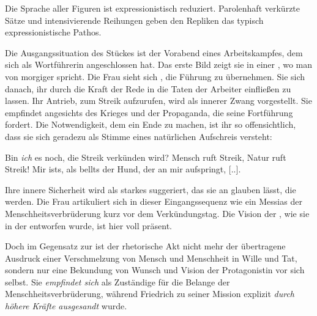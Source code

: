 Die Sprache aller Figuren ist expressionistisch reduziert. Parolenhaft
verkürzte Sätze und intensivierende Reihungen geben den Repliken das typisch
expressionistische Pathos.


Die Ausgangssituation des Stückes ist der Vorabend eines Arbeitskampfes, dem sich
\Cite{die Frau} als Wortführerin angeschlossen hat. Das erste Bild zeigt sie
in einer \Cite{Arbeiterschänke} , wo man von morgiger
\Cite{Entscheidung}
spricht. Die Frau sieht sich \Cite{bereit}, die Führung zu übernehmen. Sie
\Cite{sehnt} sich danach, ihr \Cite{Herzblut} durch die Kraft der Rede in die
Taten der Arbeiter einfließen zu lassen. Ihr Antrieb, zum Streik aufzurufen,
wird als innerer Zwang vorgestellt. Sie empfindet \Cite{Scham und Qual}
angesichts des Krieges und der Propaganda, die seine Fortführung fordert.  Die
Notwendigkeit, dem ein Ende zu machen, ist ihr so offensichtlich, dass sie sich
geradezu als Stimme eines natürlichen Aufschreis versteht:

\begin{BlockQuote}
Bin \emph{ich} es noch, die Streik verkünden wird? Mensch ruft Streik, Natur
ruft Streik! Mir ists, als bellts der Hund, der an mir aufspringt, [..].
\end{BlockQuote}
Ihre innere Sicherheit wird als starkes \Cite{Wissen} suggeriert, das sie
an \Cite{Armeen der Menschheit} glauben lässt, die \Cite{das Friedenswerk zum
unsichtbaren Dome türmen} werden.  Die Frau artikuliert sich in dieser
Eingangssequenz wie ein Messias der Menschheitsverbrüderung kurz vor dem
Verkündungstag. Die Vision der \Cite{Menschheitskathedrale}, wie sie in
der  entworfen wurde, 
ist hier voll präsent.

Doch im Gegensatz zur  ist der rhetorische Akt
nicht mehr der übertragene Ausdruck einer Verschmelzung von Mensch und
Menschheit in Wille und Tat, sondern nur eine Bekundung von Wunsch und Vision
der Protagonistin vor sich selbst. Sie \emph{empfindet sich} als Zuständige
für die Belange der Menschheitsverbrüderung, während Friedrich zu seiner
Mission explizit \emph{durch höhere Kräfte ausgesandt} wurde.   

